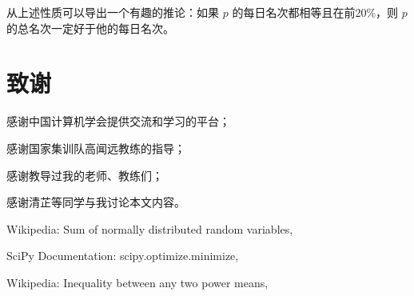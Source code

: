             从上述性质可以导出一个有趣的推论：如果 $p$ 的每日名次都相等且在前20\%，则 $p$ 的总名次一定好于他的每日名次。

\section{致谢}

    感谢中国计算机学会提供交流和学习的平台；

    感谢国家集训队高闻远教练的指导；

    感谢教导过我的老师、教练们；

    感谢清芷等同学与我讨论本文内容。

\begin{thebibliography}{9}
    Wikipedia: Sum of normally distributed random variables,\\

    SciPy Documentation: scipy.optimize.minimize,\\

    Wikipedia: Inequality between any two power means,\\
\end{thebibliography}